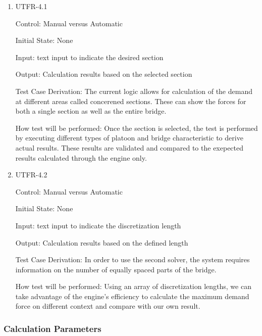 \documentclass[12pt, titlepage]{article}
\begin{document}
\begin{enumerate}

\item{UTFR-4.1\\}

Control: Manual versus Automatic
					
Initial State: None
					
Input: text input to indicate the desired section 
					
Output: Calculation results based on the selected section

Test Case Derivation: The current logic allows for calculation of the demand at different areas called concerened sections. These can show the forces for both a single section as well as the entire bridge. 

How test will be performed: Once the section is selected, the test is performed by executing different types of platoon and bridge characteristic to derive actual results. These results are validated and compared to the exepected results calculated through the engine only. 
					
\item{UTFR-4.2\\}

Control: Manual versus Automatic
					
Initial State: None
					
Input: text input to indicate the discretization length 
					
Output: Calculation results based on the defined length

Test Case Derivation: In order to use the second solver, the system requires information on the number of equally spaced parts of the bridge. 

How test will be performed: Using an array of discretization lengths, we can take advantage of the engine's efficiency to calculate the maximum demand force on different context and compare with our own result. 

\end{enumerate}


\subsubsection{Calculation Parameters}
\end{document}
